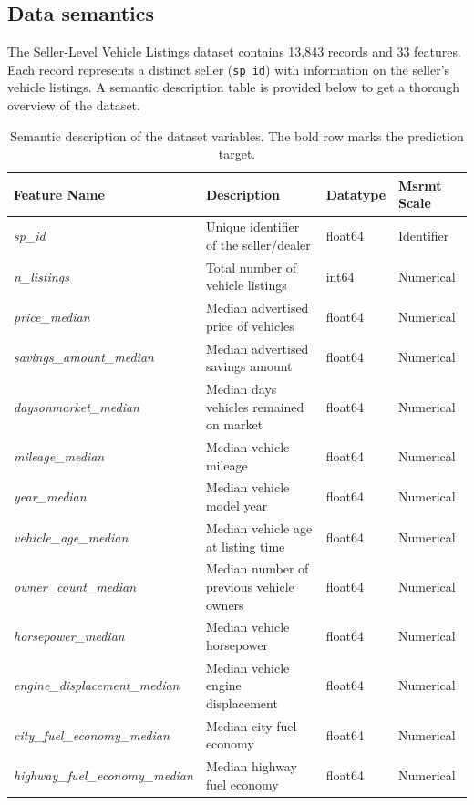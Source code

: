 \documentclass[11pt,a4paper]{article}
\numberwithin{table}{section}
\numberwithin{figure}{section}
\begin{document}
\subsection{Data semantics}
\label{sec:semantics}
The Seller-Level Vehicle Listings dataset contains 13,843 records and 33 features. Each record represents a distinct seller (\texttt{sp\_id}) with information on the seller's vehicle listings. A semantic description table is provided below to get a thorough overview of the dataset.
\begin{table}[H]
  \centering
  \caption{Semantic description of the dataset variables. The bold row marks the prediction target.}
  \label{tab:semantics}
  \footnotesize
  \setlength{\tabcolsep}{4.5pt}
  \renewcommand{\arraystretch}{1.05}
  \begin{tabularx}{\textwidth}{l X l l}
    \toprule
    Feature Name & Description & Datatype & Msrmt Scale \\
    \midrule
    \emph{sp\_id} & Unique identifier of the seller/dealer & float64 & Identifier \\
    \emph{n\_listings} & Total number of vehicle listings & int64 & Numerical \\
    \emph{price\_median} & Median advertised price of vehicles & float64 & Numerical \\
    \emph{savings\_amount\_median} & Median advertised savings amount & float64 & Numerical \\
    \emph{daysonmarket\_median} & Median days vehicles remained on market & float64 & Numerical \\
    \emph{mileage\_median} & Median vehicle mileage & float64 & Numerical \\
    \emph{year\_median} & Median vehicle model year & float64 & Numerical \\
    \emph{vehicle\_age\_median} & Median vehicle age at listing time & float64 & Numerical \\
    \emph{owner\_count\_median} & Median number of previous vehicle owners & float64 & Numerical \\
    \emph{horsepower\_median} & Median vehicle horsepower & float64 & Numerical \\
    \emph{engine\_displacement\_median} & Median vehicle engine displacement & float64 & Numerical \\
    \emph{city\_fuel\_economy\_median} & Median city fuel economy & float64 & Numerical \\
    \emph{highway\_fuel\_economy\_median} & Median highway fuel economy & float64 & Numerical \\

\end{tabularx}
\end{table}
\end{document}

